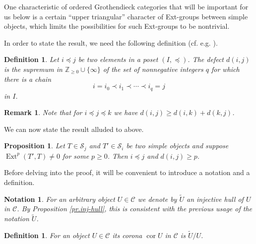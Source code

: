 \documentclass[11pt]{article}
\theoremstyle{plain}
\newtheorem{proposition}[lemma]{Proposition}
\theoremstyle{nonumberplain}
\theoremstyle{plain}
\newtheorem{definition}[lemma]{Definition}
\newtheorem{notation}[lemma]{Notation}
\newtheorem{remark}[lemma]{Remark}
\theoremstyle{nonumberplain}
\newcommand\cC{\mathcal C}
\newcommand\cS{\mathcal S}
\DeclareMathOperator{\ext}{\mathrm{Ext}}
\DeclareMathOperator{\cor}{\mathrm{cor}}
\begin{document}
One characteristic of ordered Grothendieck categories that will be
important for us below is a certain ``upper triangular'' character of
Ext-groups between simple objects, which limits the possibilities for such Ext-groups to be nontrivial. 

In order to state the result, we need the following definition (cf.
e.g. \cite[$\S$2.2]{us2}). 





\begin{definition}\label{def.def}
  Let $i{\preceq} j$ be two elements in a poset $(I,{\preceq})$. The {\it defect}
  $d(i,j)$ is the supremum in $\mathbb{Z}_{\geq0}\cup\{\infty\}$ of the set of
  nonnegative integers $q$ for which there is a chain
  \begin{equation*}
    i=i_0{\prec i_1\prec \cdots\prec} i_q=j
  \end{equation*}
in $I$.
\end{definition}


\begin{remark}\label{re.def}
  Note that for $i{\preceq j\preceq} k$ we have $d(i,j)\ge d(i,k)+d(k,j)$. 
\end{remark}


We can now state the result alluded to above. 


\begin{proposition}\label{pr.up-tri}
  Let $T\in \cS_j$ and $T'\in \cS_i$ be two simple objects and suppose
  $\ext^p(T',T)\ne 0$ for some $p\ge 0$. Then $i{\preceq} j$ and $d(i,j)\ge p$.   
\end{proposition}



Before delving into the proof, it will be convenient to introduce a notation and a definition. 

\begin{notation}\label{not.inj}
  For an arbitrary object $U\in \cC$ we denote by $\widetilde{U}$ {an
  injective hull of $U$ in} $\cC$.  By Proposition \ref{pr.inj-hull}, this is consistent with the previous usage of the notation $\widetilde{U}$.
\end{notation}


\begin{definition}\label{def.corona}
  For an object $U\in \cC$ its {\it corona} $\cor U$ in $\cC$ is
  $\widetilde{U}/U$. 
\end{definition}
\end{document}
